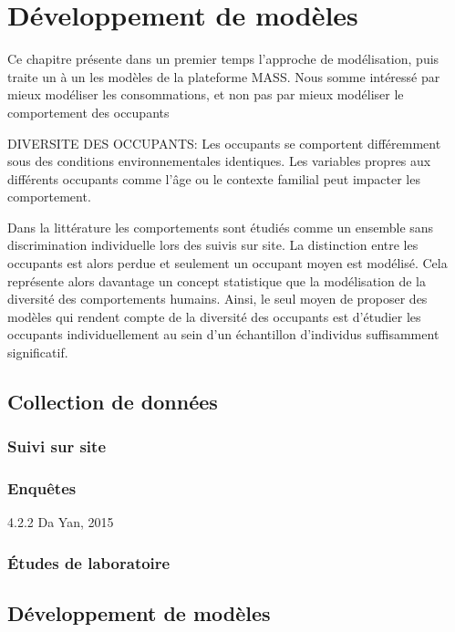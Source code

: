 \chapter{Développement de modèles}

Ce chapitre présente dans un premier temps l'approche de modélisation, puis traite un à un les modèles de la plateforme MASS.
Nous somme intéressé par mieux modéliser les consommations, et non pas par mieux modéliser le comportement des occupants

DIVERSITE DES OCCUPANTS: Les occupants se comportent différemment sous des conditions environnementales identiques. Les variables propres aux différents occupants comme l'âge ou le contexte familial peut impacter les comportement.

Dans la littérature les comportements sont étudiés comme un ensemble sans discrimination individuelle lors des suivis sur site. La distinction entre les occupants est alors perdue et seulement un occupant moyen est modélisé. Cela représente alors davantage un concept statistique que la modélisation de la diversité des comportements humains. Ainsi, le seul moyen de proposer des modèles qui rendent compte de la diversité des occupants est d'étudier les occupants individuellement au sein d'un échantillon d'individus suffisamment significatif.

\section{Collection de données}

\subsection{Suivi sur site}

\subsection{Enquêtes}

4.2.2 Da Yan, 2015

\subsection{Études de laboratoire}

\section{Développement de modèles}

